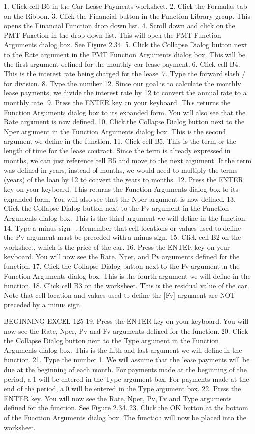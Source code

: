 1. Click cell B6 in the Car Lease Payments worksheet.
2. Click the Formulas tab on the Ribbon.
3. Click the Financial button in the Function Library group. This opens the Financial Function
drop down list.
4. Scroll down and click on the PMT Function in the drop down list. This will open the PMT
Function Arguments dialog box. See Figure 2.34.
5. Click the Collapse Dialog button next to the Rate argument in the PMT Function Arguments
dialog box. This will be the first argument defined for the monthly car lease payment.
6. Click cell B4. This is the interest rate being charged for the lease.
7. Type the forward slash / for division.
8. Type the number 12. Since our goal is to calculate the monthly lease payments, we divide the
interest rate by 12 to convert the annual rate to a monthly rate.
9. Press the ENTER key on your keyboard. This returns the Function Arguments dialog box to its
expanded form. You will also see that the Rate argument is now defined.
10. Click the Collapse Dialog button next to the Nper argument in the Function Arguments dialog
box. This is the second argument we define in the function.
11. Click cell B5. This is the term or the length of time for the lease contract. Since the term is
already expressed in months, we can just reference cell B5 and move to the next argument. If the
term was defined in years, instead of months, we would need to multiply the terms (years) of the
loan by 12 to convert the years to months.
12. Press the ENTER key on your keyboard. This returns the Function Arguments dialog box to its
expanded form. You will also see that the Nper argument is now defined.
13. Click the Collapse Dialog button next to the Pv argument in the Function Arguments dialog
box. This is the third argument we will define in the function.
14. Type a minus sign -. Remember that cell locations or values used to define the Pv argument
must be preceded with a minus sign.
15. Click cell B2 on the worksheet, which is the price of the car.
16. Press the ENTER key on your keyboard. You will now see the Rate, Nper, and Pv arguments
defined for the function.
17. Click the Collapse Dialog button next to the Fv argument in the Function Arguments dialog
box. This is the fourth argument we will define in the function.
18. Click cell B3 on the worksheet. This is the residual value of the car. Note that cell location and
values used to define the [Fv] argument are NOT preceded by a minus sign.


BEGINNING EXCEL 125
19. Press the ENTER key on your keyboard. You will now see the Rate, Nper, Pv and Fv arguments
defined for the function.
20. Click the Collapse Dialog button next to the Type argument in the Function Arguments dialog
box. This is the fifth and last argument we will define in the function.
21. Type the number 1. We will assume that the lease payments will be due at the beginning of each
month. For payments made at the beginning of the period, a 1 will be entered in the Type
argument box. For payments made at the end of the period, a 0 will be entered in the Type
argument box.
22. Press the ENTER key. You will now see the Rate, Nper, Pv, Fv and Type arguments defined for
the function. See Figure 2.34.
23. Click the OK button at the bottom of the Function Arguments dialog box. The function will
now be placed into the worksheet.


